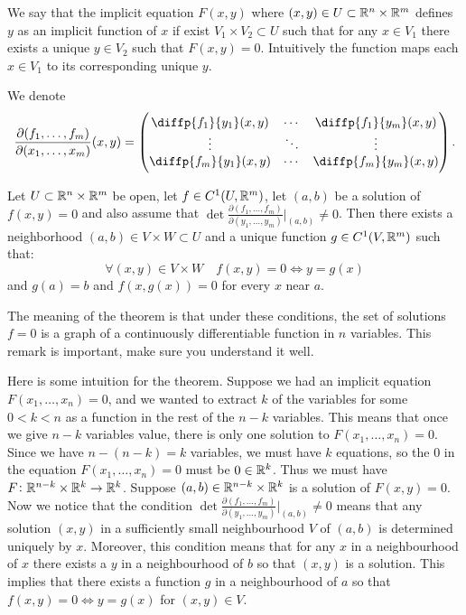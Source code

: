 \documentclass[11pt,a4paper]{article}
\begin{document}
\begin{remark}
  We say that the implicit equation $F(x,y)$ where 
  $(x,y) \in U \subset \mathbb{R}^n \times \mathbb{R}^m$ defines $y$ as an implicit 
  function of $x$ if exist $V_1 \times V_2 \subset U$ such that 
  for any $x \in V_1$ there exists a unique $y \in V_2$ such that $F(x,y) = 0$.
  Intuitively the function maps each $x \in V_1$ to its corresponding
  unique $y$.
\end{remark}

\begin{remark}
  We denote
  \[
    \frac{\partial(f_1,\dots,f_m)}{\partial(x_1,\dots,x_m)}(x,y) =
    \begin{pmatrix}
      \diffp{{f_1}}{{y_1}}(x,y) & \cdots & \diffp{{f_1}}{{y_m}}(x,y) \\
      \vdots & \ddots & \vdots \\
      \diffp{{f_m}}{{y_1}}(x,y) & \cdots & \diffp{{f_m}}{{y_m}}(x,y)
    \end{pmatrix}.
  \]
\end{remark}

\begin{theorem}
  Let $U \subset \mathbb{R}^n \times \mathbb{R}^m$ be open,
  let $f \in C^1(U,\mathbb{R}^m)$, 
  let $(a,b)$ be a solution of $f(x,y) = 0$ and also assume that
  $\det\frac{\partial(f_1,\dots,f_m)}{\partial(y_1,\dots,y_m)}\vert_{(a,b)} \neq 0$.
  Then there exists a neighborhood $(a,b) \in V \times W \subset U$ and
  a unique function $g \in C^1(V,\mathbb{R}^m)$ such that:
  \[
    \forall (x,y) \in V \times W \quad f(x,y) = 0 \iff y = g(x)
  \]
  and $g(a) = b$ and $f(x,g(x)) = 0$ for every $x$ near $a$.
\end{theorem}
\begin{remark}
  The meaning of the theorem is that under these conditions,
  the set of solutions $f = 0$ is a graph of a continuously differentiable
  function in $n$ variables.
  This remark is important, make sure you understand it well.
\end{remark}
\begin{remark}
  Here is some intuition for the theorem.
  Suppose we had an implicit equation $F(x_1,\dots,x_n) = 0$,
  and we wanted to extract $k$ of the variables for some $0 < k < n$ as a function
  in the rest of the $n - k$ variables.
  This means that once we give $n - k$ variables value,
  there is only one solution to $F(x_1,\dots,x_n) = 0$.
  Since we have $n - (n - k) = k$ variables,
  we must have $k$ equations, so the $0$ in the equation
  $F(x_1,\dots,x_n) = 0$ must be $0 \in \mathbb{R}^k$.
  Thus we must have $F \colon \mathbb{R}^{n-k} \times \mathbb{R}^k \to \mathbb{R}^k$.
  Suppose $(a,b) \in \mathbb{R}^{n-k} \times \mathbb{R}^k$ is a solution of $F(x,y) = 0$.
  Now we notice that the condition
  $\det\frac{\partial(f_1,\dots,f_m)}{\partial(y_1,\dots,y_m)}\vert_{(a,b)} \neq 0$
  means that any solution $(x,y)$ in a
  sufficiently small neighbourhood $V$ of $(a,b)$ is determined uniquely by $x$.
  Moreover, this condition means that for any $x$ in a neighbourhood of $x$
  there exists a $y$ in a neighbourhood of $b$ so that $(x,y)$ is a solution.
  This implies that there exists a function $g$ in a neighbourhood of $a$
  so that $f(x,y) = 0 \iff y = g(x)$ for $(x,y) \in V$.
\end{remark}
\end{document}
